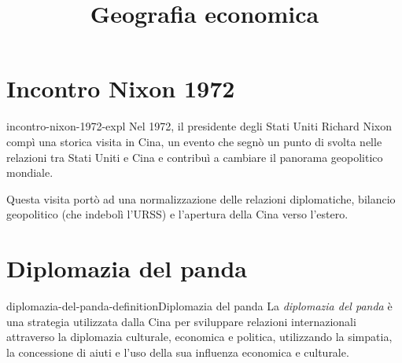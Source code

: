 \documentclass[preview]{standalone}
\begin{document}
\title{Geografia economica}
\genpage

\section{Incontro Nixon 1972}

\begin{snippet}{incontro-nixon-1972-expl}
    Nel 1972, il presidente degli Stati Uniti Richard Nixon compì
    una storica visita in Cina, un evento che segnò un punto di svolta nelle
    relazioni tra Stati Uniti e Cina e contribuì a cambiare il panorama geopolitico mondiale.

    Questa visita portò ad una normalizzazione delle relazioni diplomatiche,
    bilancio geopolitico (che indebolì l'URSS) e l'apertura della Cina verso l'estero.
\end{snippet}

\section{Diplomazia del panda}

\begin{snippetdefinition}{diplomazia-del-panda-definition}{Diplomazia del panda}
    La \textit{diplomazia del panda} è una strategia utilizzata dalla Cina per sviluppare relazioni internazionali attraverso la diplomazia culturale, economica e politica, utilizzando la simpatia, la concessione di aiuti e l'uso della sua influenza economica e culturale.
\end{snippetdefinition}
\end{document}
